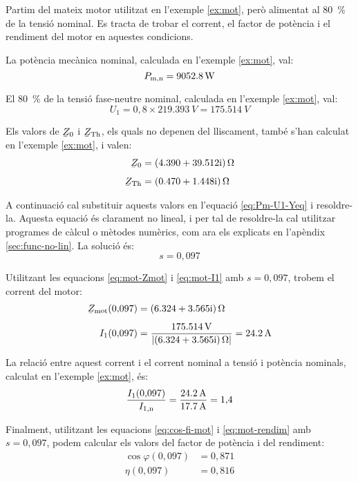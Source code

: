 \begin{exemple}
	Partim del mateix motor utilitzat en l'exemple \vref{ex:mot}, però alimentat al \qty{80}{\%} de la tensió nominal. Es tracta de trobar el corrent, el factor de potència i el rendiment del motor en aquestes condicions.
	
	La potència mecànica nominal, calculada  en l'exemple \ref{ex:mot}, val: \[
	P_\mathrm{m,n} = \qty{9052,8}{W}
	\]
	
	El \qty{80}{\%} de la tensió fase-neutre nominal, calculada  en l'exemple \ref{ex:mot}, val:
	\[
	U_1 = 0{,}8\times\qty{219,393}{V} = \qty{175,514}{V}
	\]
	
	Els valors de $\cmplx{Z}_0$ i  $\cmplx{Z}\ped{Th}$, els quals no depenen del lliscament, també s'han calculat en  l'exemple \ref{ex:mot}, i valen:
	\begin{align*}
	\cmplx{Z}_0 &=  \complexqty{4,390+j39,512}{\ohm} \\[1ex]
	\cmplx{Z}\ped{Th} &= \complexqty{0,470+j1,448}{\ohm} 
	\end{align*}
	
	A continuació cal substituir aquests valors en l'equació \eqref{eq:Pm-U1-Yeq} i resoldre-la. Aquesta equació és clarament no lineal, i per tal de resoldre-la cal utilitzar programes de càlcul o mètodes numèrics, com ara els explicats en l'apèndix \ref{sec:func-no-lin}. La solució és:
	\[
	s = 0{,}097
	\]
	
	Utilitzant les equacions \eqref{eq:mot-Zmot} i \eqref{eq:mot-I1} amb $s  = 0{,}097$, trobem el corrent del motor:
	\begin{align*}
	\cmplx{Z}\ped{mot}(0{,}097) &=  \complexqty{6,324+j3,565}{\ohm} \\[1ex]
	I_1(0{,}097) &= \frac{\qty{175,514}{V}}{|\complexqty{6,324+j3,565}{\ohm}|} = \qty{24,2}{A}
	\end{align*}
	
	La relació entre aquest  corrent i el corrent nominal a tensió i potència nominals, calculat en l'exemple \ref{ex:mot}, és:
	\[
	\frac{I_1(0{,}097)}{I_\mathrm{1,n}} = \frac{\qty{24,2}{A}}{\qty{17,7}{A}} = 1{,}4
	\]
	
	Finalment, utilitzant les equacions  \eqref{eq:cos-fi-mot} i \eqref{eq:mot-rendim} amb $s  = 0{,}097$, podem calcular els valors del factor de potència i del rendiment:
	\begin{align*}
	\cos\varphi(0{,}097) &=  0{,}871 \\
	\eta(0{,}097) &=  0{,}816
	\end{align*}
	

\end{exemple}
